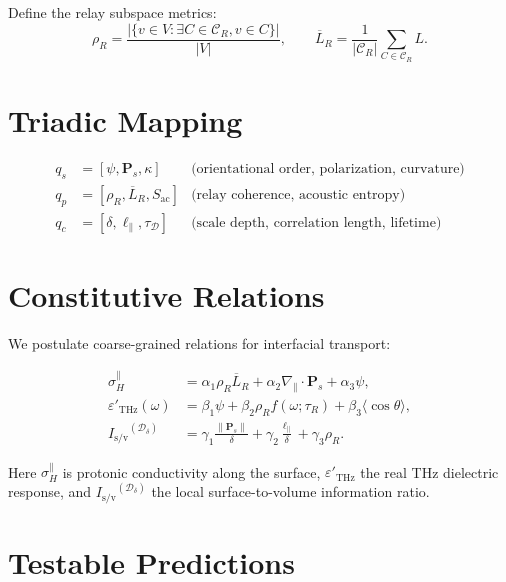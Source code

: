 \documentclass[12pt,oneside]{memoir}
\theoremstyle{plain}
\theoremstyle{definition}
\theoremstyle{remark}
\newcommand{\Isv}{\ensuremath{I_{\mathrm{s}/\mathrm{v}}}}
\begin{document}
\noindent
Define the relay subspace metrics:
\[
\rho_R = \frac{|\{ v\in V : \exists C\in\mathcal{C}_R, v\in C\}|}{|V|}, 
\qquad
\overline{L}_R = \frac{1}{|\mathcal{C}_R|}\sum_{C\in\mathcal{C}_R} L.
\]

\section{Triadic Mapping}

\begin{align}
q_s &= [\psi, \mathbf{P}_s, \kappa] & \text{(orientational order, polarization, curvature)} \\
q_p &= [\rho_R, \overline{L}_R, S_{\mathrm{ac}}] & \text{(relay coherence, acoustic entropy)} \\
q_c &= [\delta, \ell_\parallel, \tau_{\mathcal{D}}] & \text{(scale depth, correlation length, lifetime)}
\end{align}

\section{Constitutive Relations}

We postulate coarse-grained relations for interfacial transport:

\begin{align}
\sigma_H^{\parallel} & = \alpha_1 \rho_R \overline{L}_R + \alpha_2 \nabla_\parallel\!\cdot \mathbf{P}_s + \alpha_3 \psi, 
\label{eq:BSW-sigma}\\
\varepsilon'_{\mathrm{THz}}(\omega) & = \beta_1 \psi + \beta_2 \rho_R f(\omega;\tau_R) + \beta_3 \langle \cos\theta \rangle, 
\label{eq:BSW-dielectric}\\
\Isv^{(\mathcal{D}_\delta)} & = \gamma_1 \frac{\|\mathbf{P}_s\|}{\delta} + \gamma_2 \frac{\ell_\parallel}{\delta} + \gamma_3 \rho_R.
\label{eq:BSW-Isv}
\end{align}

\noindent
Here $\sigma_H^{\parallel}$ is protonic conductivity along the surface, 
$\varepsilon'_{\mathrm{THz}}$ the real THz dielectric response,
and $\Isv^{(\mathcal{D}_\delta)}$ the local surface-to-volume information ratio.

\section{Testable Predictions}
\end{document}
